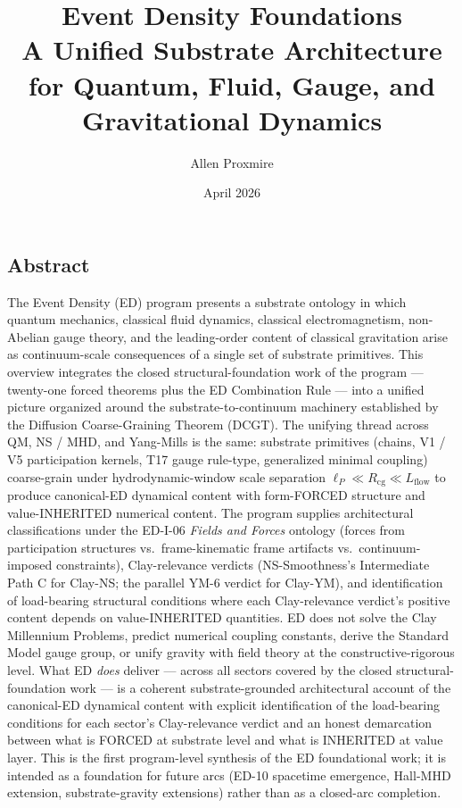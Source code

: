 \documentclass[
  11pt,
  a4paper,
]{article}
\title{Event Density Foundations\\
\large A Unified Substrate Architecture for Quantum, Fluid, Gauge, and
Gravitational Dynamics}
\author{Allen Proxmire}
\date{April 2026}
\begin{document}
\maketitle

\subsection{Abstract}\label{abstract}

The Event Density (ED) program presents a substrate ontology in which
quantum mechanics, classical fluid dynamics, classical electromagnetism,
non-Abelian gauge theory, and the leading-order content of classical
gravitation arise as continuum-scale consequences of a single set of
substrate primitives. This overview integrates the closed
structural-foundation work of the program --- twenty-one forced theorems
plus the ED Combination Rule --- into a unified picture organized around
the substrate-to-continuum machinery established by the Diffusion
Coarse-Graining Theorem (DCGT). The unifying thread across QM, NS / MHD,
and Yang-Mills is the same: substrate primitives (chains, V1 / V5
participation kernels, T17 gauge rule-type, generalized minimal
coupling) coarse-grain under hydrodynamic-window scale separation
\(\ell_P \ll R_\mathrm{cg} \ll L_\mathrm{flow}\) to produce canonical-ED
dynamical content with form-FORCED structure and value-INHERITED
numerical content. The program supplies architectural classifications
under the ED-I-06 \emph{Fields and Forces} ontology (forces from
participation structures vs.~frame-kinematic frame artifacts
vs.~continuum-imposed constraints), Clay-relevance verdicts
(NS-Smoothness's Intermediate Path C for Clay-NS; the parallel YM-6
verdict for Clay-YM), and identification of load-bearing structural
conditions where each Clay-relevance verdict's positive content depends
on value-INHERITED quantities. ED does not solve the Clay Millennium
Problems, predict numerical coupling constants, derive the Standard
Model gauge group, or unify gravity with field theory at the
constructive-rigorous level. What ED \emph{does} deliver --- across all
sectors covered by the closed structural-foundation work --- is a
coherent substrate-grounded architectural account of the canonical-ED
dynamical content with explicit identification of the load-bearing
conditions for each sector's Clay-relevance verdict and an honest
demarcation between what is FORCED at substrate level and what is
INHERITED at value layer. This is the first program-level synthesis of
the ED foundational work; it is intended as a foundation for future arcs
(ED-10 spacetime emergence, Hall-MHD extension, substrate-gravity
extensions) rather than as a closed-arc completion.
\end{document}
